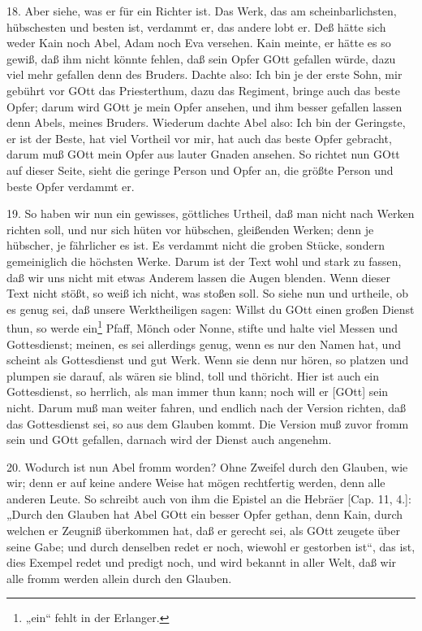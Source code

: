 18. Aber siehe, was er für ein Richter ist. Das Werk, das am scheinbarlichsten, hübschesten und besten ist, verdammt er, das andere lobt er. Deß hätte sich weder Kain noch Abel, Adam noch Eva versehen. Kain meinte, er hätte es so gewiß, daß ihm nicht könnte fehlen, daß sein Opfer GOtt gefallen würde, dazu viel mehr gefallen denn des Bruders. Dachte also: Ich bin je der erste Sohn, mir gebührt vor GOtt das Priesterthum, dazu das Regiment, bringe auch das beste Opfer; darum wird GOtt je mein Opfer ansehen, und ihm besser gefallen lassen denn Abels, meines Bruders. Wiederum dachte Abel also: Ich bin der Geringste, er ist der Beste, hat viel Vortheil vor mir, hat auch das beste Opfer gebracht, darum muß GOtt mein Opfer aus lauter Gnaden ansehen. So richtet nun GOtt auf dieser Seite, sieht die geringe Person und Opfer an, die größte Person und beste Opfer verdammt er.

19. So haben wir nun ein gewisses, göttliches Urtheil, daß man nicht nach Werken richten soll, und nur sich hüten vor hübschen, gleißenden Werken; denn je hübscher, je fährlicher es ist. Es verdammt nicht die groben Stücke, sondern gemeiniglich die höchsten Werke. Darum ist der Text wohl und stark zu fassen, daß wir uns nicht mit etwas Anderem lassen die Augen blenden. Wenn dieser Text nicht stößt, so weiß ich nicht,
was stoßen soll. So siehe nun und urtheile, ob es genug sei, daß unsere Werktheiligen sagen: Willst du GOtt einen großen Dienst thun, so werde ein\footnote{„ein“ fehlt in der Erlanger.} Pfaff, Mönch oder Nonne, stifte und halte viel Messen und Gottesdienst; meinen, es sei allerdings genug, wenn es nur den Namen hat, und scheint als Gottesdienst und gut Werk. Wenn sie denn nur hören, so platzen und plumpen sie darauf, als wären sie blind, toll und thöricht. Hier ist auch ein Gottesdienst, so herrlich, als man immer thun kann; noch will er [GOtt] sein nicht. Darum muß man weiter fahren, und endlich nach der Version richten, daß das Gottesdienst sei, so aus dem Glauben kommt. Die Version muß zuvor fromm sein und GOtt gefallen, darnach wird der Dienst auch angenehm.

20. Wodurch ist nun Abel fromm worden? Ohne Zweifel durch den Glauben, wie wir; denn er auf keine andere Weise hat mögen rechtfertig werden, denn alle anderen Leute. So schreibt auch von ihm die Epistel an die Hebräer [Cap. 11, 4.]: „Durch den Glauben hat Abel GOtt ein besser Opfer gethan, denn Kain, durch welchen er Zeugniß überkommen hat, daß er gerecht sei, als GOtt zeugete über seine Gabe; und durch denselben redet er noch, wiewohl er gestorben ist“, das ist, dies Exempel redet und predigt noch, und wird bekannt in aller Welt, daß wir alle fromm werden allein durch den Glauben.

